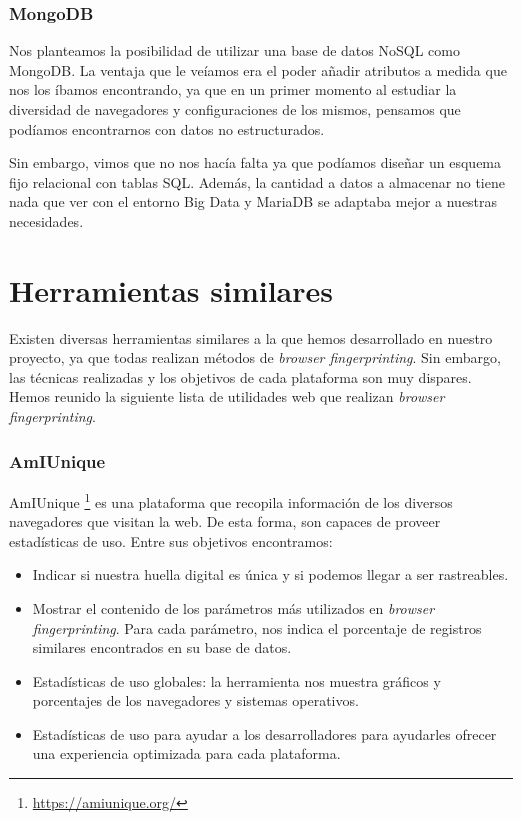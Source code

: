 \subsubsection{MongoDB}
Nos planteamos la posibilidad de utilizar una base de datos NoSQL como MongoDB. La ventaja que le veíamos era el poder añadir atributos a medida que nos los íbamos encontrando, ya que en un primer momento al estudiar la diversidad de navegadores y configuraciones de los mismos, pensamos que podíamos encontrarnos con datos no estructurados. \par 

Sin embargo, vimos que no nos hacía falta ya que podíamos diseñar un esquema fijo relacional con tablas SQL. Además, la cantidad a datos a almacenar no tiene nada que ver con el entorno Big Data y MariaDB se adaptaba mejor a nuestras necesidades. \par 

\section{Herramientas similares}

Existen diversas herramientas similares a la que hemos desarrollado en nuestro proyecto, ya que todas realizan métodos de \textit{browser fingerprinting}. Sin embargo, las técnicas realizadas y los objetivos de cada plataforma son muy dispares. Hemos reunido la siguiente lista de utilidades web que realizan \textit{browser fingerprinting}. \par

\subsubsection{AmIUnique}

AmIUnique \footnote{\url{https://amiunique.org/}} es una plataforma que recopila información de los diversos navegadores que visitan la web. De esta forma, son capaces de proveer estadísticas de uso. Entre sus objetivos encontramos: \par 
\begin{itemize}
	\item Indicar si nuestra huella digital es única y si podemos llegar a ser rastreables.
	\item Mostrar el contenido de los parámetros más utilizados en \textit{browser fingerprinting}. Para cada parámetro, nos indica el porcentaje de registros similares encontrados en su base de datos.
	\item Estadísticas de uso globales: la herramienta nos muestra gráficos y porcentajes de los navegadores y sistemas operativos.
	\item Estadísticas de uso para ayudar a los desarrolladores para ayudarles ofrecer una experiencia optimizada para cada plataforma.
\end{itemize}


